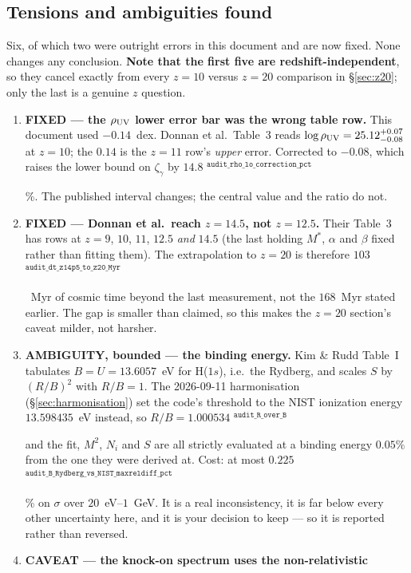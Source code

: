 \documentclass[11pt,a4paper]{article}
\newif\ifprovdraft
\newcommand{\src}[1]{%
  \ifprovdraft
    \ifmmode{}^{\text{\color{gray}\scriptsize\texttt{#1}}}%
    \else{\color{gray}\scriptsize$^{\texttt{#1}}$}%
    \fi
  \fi}
\begin{document}
\subsection{Tensions and ambiguities found}
Six, of which two were outright errors in this document and are now fixed. None
changes any conclusion. \textbf{Note that the first five are
redshift-independent}, so they cancel exactly from every $z=10$ versus $z=20$
comparison in \S\ref{sec:z20}; only the last is a genuine $z$ question.

\begin{enumerate}\itemsep4pt
\item \textbf{FIXED --- the $\rho_{\rm UV}$ lower error bar was the wrong table
      row.} This document used $-0.14$~dex. Donnan et al.\ Table~3 reads
      $\log\rho_{\rm UV} = 25.12^{+0.07}_{-0.08}$ at $z=10$; the $0.14$ is the
      $z=11$ row's \emph{upper} error. Corrected to $-0.08$, which raises the
      lower bound on $\zeta_\gamma$ by
      $14.8$\src{audit\_rho\_lo\_correction\_pct}\%. The published interval
      changes; the central value and the ratio do not.
\item \textbf{FIXED --- Donnan et al.\ reach $z=14.5$, not $z=12.5$.} Their
      Table~3 has rows at $z = 9$, $10$, $11$, $12.5$ \emph{and} $14.5$ (the
      last holding $M^\ast$, $\alpha$ and $\beta$ fixed rather than fitting
      them). The extrapolation to $z=20$ is therefore
      $103$\src{audit\_dt\_z14p5\_to\_z20\_Myr}~Myr of cosmic time beyond the
      last measurement, not the $168$~Myr stated earlier. The gap is smaller than
      claimed, so this makes the $z=20$ section's caveat milder, not harsher.
\item \textbf{AMBIGUITY, bounded --- the binding energy.} Kim \& Rudd Table~I
      tabulates $B = U = 13.6057$~eV for H($1s$), i.e.\ the Rydberg, and scales
      $S$ by $(R/B)^2$ with $R/B=1$. The 2026-09-11 harmonisation
      (\S\ref{sec:harmonisation}) set the code's threshold to the NIST ionization
      energy $13.598435$~eV instead, so $R/B =
      1.000534$\src{audit\_R\_over\_B} and the fit, $M^2$, $N_i$ and $S$ are all
      strictly evaluated at a binding energy $0.05\%$ from the one they were
      derived at. Cost: at most
      $0.225$\src{audit\_B\_Rydberg\_vs\_NIST\_maxreldiff\_pct}\% on $\sigma$ over
      $20$~eV--$1$~GeV. It is a real inconsistency, it is far below every other
      uncertainty here, and it is your decision to keep --- so it is reported
      rather than reversed.
\item \textbf{CAVEAT --- the knock-on spectrum uses the non-relativistic
}
\end{enumerate}
\end{document}
